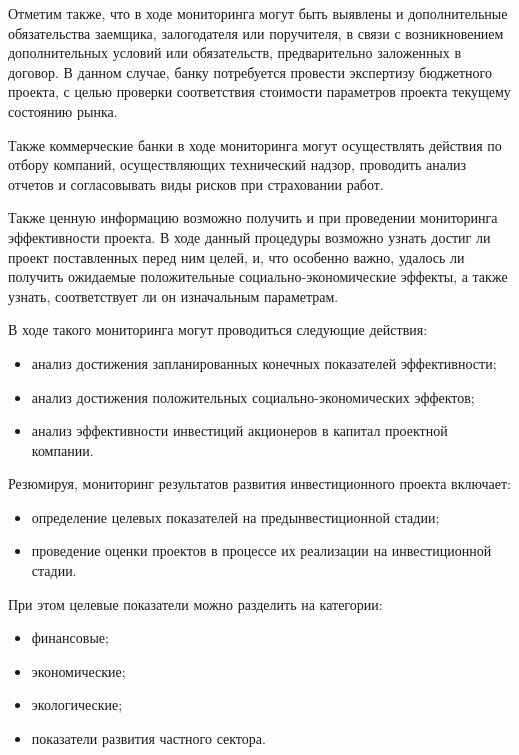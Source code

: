 \documentclass[12pt,a4paper]{article} %
\begin{document}
Отметим также, что в ходе мониторинга могут быть выявлены и дополнительные обязательства заемщика, залогодателя или поручителя, в связи с возникновением дополнительных условий или обязательств, предварительно заложенных в договор. В данном случае, банку потребуется провести экспертизу бюджетного проекта, с целью проверки соответствия стоимости параметров проекта текущему состоянию рынка.

Также коммерческие банки в ходе мониторинга могут осуществлять действия по отбору компаний, осуществляющих технический надзор, проводить анализ отчетов и согласовывать виды рисков при страховании работ.

Также ценную информацию возможно получить и при проведении мониторинга эффективности проекта. В ходе данный процедуры возможно узнать достиг ли проект поставленных перед ним целей, и, что особенно важно, удалось ли получить ожидаемые положительные социально-экономические эффекты, а также узнать, соответствует ли он изначальным параметрам.

В ходе такого мониторинга могут проводиться следующие действия:
\begin{itemize}
	\item анализ достижения запланированных конечных показателей эффективности;
	\item анализ достижения положительных социально-экономических эффектов;
	\item анализ эффективности инвестиций акционеров в капитал проектной компании. 
\end{itemize}

Резюмируя, мониторинг результатов развития инвестиционного проекта включает:
\begin{itemize}
	\item определение целевых показателей на предынвестиционной стадии;
	\item проведение оценки проектов в процессе их реализации на инвестиционной стадии.
\end{itemize}

При этом целевые показатели можно разделить на категории:
\begin{itemize}
	\item финансовые;
	\item экономические;
	\item экологические;
	\item показатели развития частного сектора.
\end{itemize}
\end{document}
